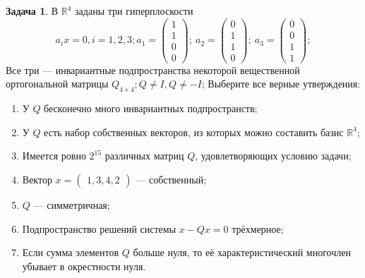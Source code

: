 \documentclass[a4paper,12pt]{article}
\theoremstyle{definition}
\newtheorem{problem}{Задача}
\begin{document}
\begin{problem}
В $\mathbb{R}^4$ заданы три гиперплоскости
\begin{equation*}
	a_ix=0,
	i=1,2,3;
	a_1 = \begin{pmatrix}
		1 \\
		1 \\
		0 \\
		0 
	\end{pmatrix};~
	a_2 = \begin{pmatrix}
		0 \\
		1 \\
		1 \\
		0 
	\end{pmatrix};~
	a_3 = \begin{pmatrix}
		0 \\
		0 \\
		1 \\
		1 
	\end{pmatrix};
\end{equation*}
Все три --- инвариантные подпространства некоторой вещественной ортогональной матрицы $Q_{4\times4}; Q \neq I, Q \neq -I$;
Выберите все верные утверждения:
\begin{enumerate}
	\item У $Q$ бесконечно много инвариантных подпространств;
	\item У $Q$ есть набор собственных векторов, из которых можно составить базис $\mathbb{R}^4$;
	\item Имеется ровно $2^{15}$ различных матриц $Q$, удовлетворяющих условию задачи;
	\item Вектор $x = \begin{pmatrix}1,3,4,2\end{pmatrix}$ --- собственный;
	\item $Q$ --- симметричная;
	\item Подпространство решений системы $x-Qx=0$ трёхмерное;
	\item Если сумма элементов $Q$ больше нуля, то её характеристический многочлен убывает в окрестности нуля. 
\end{enumerate}
\end{problem}
\end{document}
